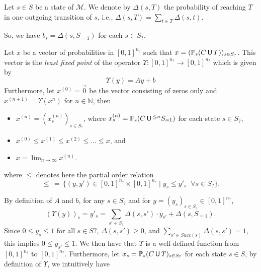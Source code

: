 \begin{notation}
  Let $s \in S$ be a state of $\mathcal{M}$. We denote by $\Delta(s, T)$ the probability of reaching $T$ in one outgoing transition of $s$, i.e., $\Delta(s, T) = \sum_{t \in T} \Delta(s, t)$.
\end{notation}
\noindent So, we have $b_s = \Delta(s, S_{=1})$ for each $s \in S_?$.
\begin{theorem}\label{theoCUT}
  Let $x$ be a vector of probabilities in $[0,1]^{n_?}$ such that $x=(\mathbb{P}_s(C \,\text{\sffamily U}\, T))_{s \in S_?}$. This vector is the
  \textit{least fixed point} of the operator $\Upsilon : [0, 1]^{n_?} \rightarrow [0, 1]^{n_?}$ which is given by %
  \[
    \Upsilon(y) = A y + b
  \]
  Furthermore, let $x^{(0)} = \vec{0}$ be the vector consisting of zeros only and $x^{(n+1)} = \Upsilon(x^{n})$ for $n \in \mathbb{N}$, then
  \begin{itemize}
    \item $x^{(n)} = (x_s^{(n)})_{s \in S_?}$, where $x_s^{(n)} = \mathbb{P}_s(C \,\text{\sffamily U}\,^{\leq n} S_{=1})$ for each state $s \in S_?$,
    \item $x^{(0)} \leq x^{(1)} \leq x^{(2)} \leq \dots \leq x$, and
    \item $x = \lim_{n\rightarrow\infty}x^{(n)}$.
  \end{itemize}
  where $\leq$ denotes here the partial order relation \[\leq \,=\, \{ (y, y') \in [0, 1]^{n_?} \times [0,1]^{n_?} \; | \; y_s \leq y'_{s} \;\; \forall s \in S_?\}.\]
\end{theorem}
\noindent By definition of $A$ and $b$, for any $s \in S_?$ and for $y = (y_s)_{s \in S_?} \in [0, 1]^{n_?}$,
\[
  (\Upsilon(y))_s = y'_s = \sum_{s' \in S_?} \Delta(s, s') \cdot y_{s'} + \Delta(s, S_{=1}).
\]
Since $0 \leq y_s \leq 1$ for all $s \in S?$,
$\Delta(s,s') \geq 0$, and $\sum_{s' \in Succ(s)}
\Delta(s, s')=1$, this implies $0 \leq y_{s'}\leq 1$.
We then have that $\Upsilon$ is a well-defined function from $[0, 1]^{n_?}$ to $[0, 1]^{n_?}$.
Furthermore, let $x_s = \mathbb{P}_s(C \,\text{\sffamily U}\, T)_{s \in S_?}$ for each state $s \in S$, by definition of $\Upsilon$, we intuitively have
